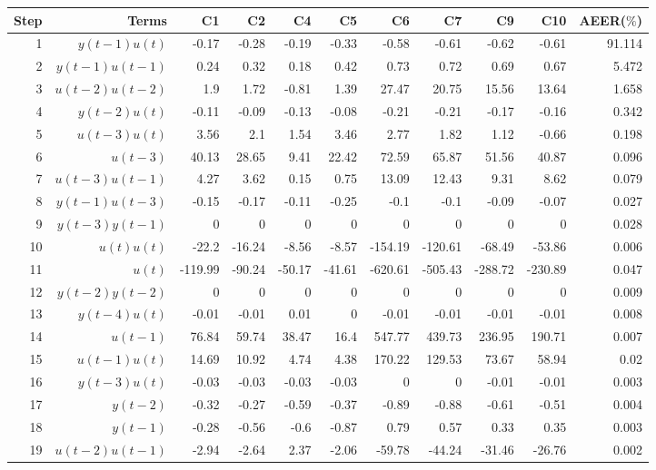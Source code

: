 \begin{tabular}{rrrrrrrrrrr}
Step & Terms & C1 & C2 & C4 & C5 & C6 & C7 & C9 & C10 & AEER($\%$) \\ 
\hline 
1 & $y(t-1)u(t)$ & -0.17 & -0.28 & -0.19 & -0.33 & -0.58 & -0.61 & -0.62 & -0.61 & 91.114 \\ 
2 & $y(t-1)u(t-1)$ & 0.24 & 0.32 & 0.18 & 0.42 & 0.73 & 0.72 & 0.69 & 0.67 & 5.472 \\ 
3 & $u(t-2)u(t-2)$ & 1.9 & 1.72 & -0.81 & 1.39 & 27.47 & 20.75 & 15.56 & 13.64 & 1.658 \\ 
4 & $y(t-2)u(t)$ & -0.11 & -0.09 & -0.13 & -0.08 & -0.21 & -0.21 & -0.17 & -0.16 & 0.342 \\ 
5 & $u(t-3)u(t)$ & 3.56 & 2.1 & 1.54 & 3.46 & 2.77 & 1.82 & 1.12 & -0.66 & 0.198 \\ 
6 & $u(t-3)$ & 40.13 & 28.65 & 9.41 & 22.42 & 72.59 & 65.87 & 51.56 & 40.87 & 0.096 \\ 
7 & $u(t-3)u(t-1)$ & 4.27 & 3.62 & 0.15 & 0.75 & 13.09 & 12.43 & 9.31 & 8.62 & 0.079 \\ 
8 & $y(t-1)u(t-3)$ & -0.15 & -0.17 & -0.11 & -0.25 & -0.1 & -0.1 & -0.09 & -0.07 & 0.027 \\ 
9 & $y(t-3)y(t-1)$ & 0 & 0 & 0 & 0 & 0 & 0 & 0 & 0 & 0.028 \\ 
10 & $u(t)u(t)$ & -22.2 & -16.24 & -8.56 & -8.57 & -154.19 & -120.61 & -68.49 & -53.86 & 0.006 \\ 
11 & $u(t)$ & -119.99 & -90.24 & -50.17 & -41.61 & -620.61 & -505.43 & -288.72 & -230.89 & 0.047 \\ 
12 & $y(t-2)y(t-2)$ & 0 & 0 & 0 & 0 & 0 & 0 & 0 & 0 & 0.009 \\ 
13 & $y(t-4)u(t)$ & -0.01 & -0.01 & 0.01 & 0 & -0.01 & -0.01 & -0.01 & -0.01 & 0.008 \\ 
14 & $u(t-1)$ & 76.84 & 59.74 & 38.47 & 16.4 & 547.77 & 439.73 & 236.95 & 190.71 & 0.007 \\ 
15 & $u(t-1)u(t)$ & 14.69 & 10.92 & 4.74 & 4.38 & 170.22 & 129.53 & 73.67 & 58.94 & 0.02 \\ 
16 & $y(t-3)u(t)$ & -0.03 & -0.03 & -0.03 & -0.03 & 0 & 0 & -0.01 & -0.01 & 0.003 \\ 
17 & $y(t-2)$ & -0.32 & -0.27 & -0.59 & -0.37 & -0.89 & -0.88 & -0.61 & -0.51 & 0.004 \\ 
18 & $y(t-1)$ & -0.28 & -0.56 & -0.6 & -0.87 & 0.79 & 0.57 & 0.33 & 0.35 & 0.003 \\ 
19 & $u(t-2)u(t-1)$ & -2.94 & -2.64 & 2.37 & -2.06 & -59.78 & -44.24 & -31.46 & -26.76 & 0.002 \\ 
\hline 
\end{tabular}